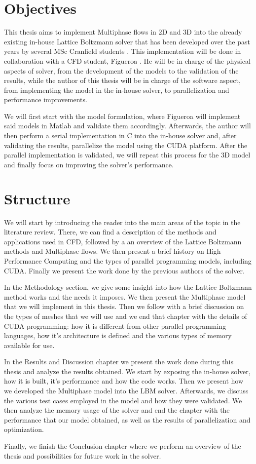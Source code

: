\documentclass[12pt]{book}
\begin{document}
\section{Objectives}
This thesis aims to implement Multiphase flows in 2D and 3D into the already existing in-house Lattice Boltzmann solver that has been developed over the past years by several MSc Cranfield students  \cite{maciej_thesis,koleszar_thesis,jozsa_thesis,szoke_thesis}. This implementation will be done in collaboration with a CFD student, Figueroa \cite{antonioThesis}. He will be in charge of the physical aspects of solver, from the development of the models to the validation of the results, while the author of this thesis will be in charge of the software aspect, from implementing the model in the in-house solver, to parallelization and performance improvements. \par
We will first start with the model formulation, where Figueroa will implement said models in Matlab and validate them accordingly. Afterwards, the author will then perform a serial implementation in C into the in-house solver and, after validating the results, parallelize the model using the CUDA platform. After the parallel implementation is validated, we will repeat this process for the 3D model and finally focus on improving the solver's performance. 
\section{Structure}
We will start by introducing the reader into the main areas of the topic in the literature review. There, we can find a description of the methods and applications used in CFD, followed by a an overview of the Lattice Boltzmann methods and Multiphase flows. We then present a brief history on High Performance Computing and the types of parallel programming models, including CUDA. Finally we present the work done by the previous authors of the solver.\par
In the Methodology section, we give some insight into how the Lattice Boltzmann method works and the needs it imposes. We then present the Multiphase model that we will implement in this thesis. Then we follow with a brief discussion on the types of meshes that we will use and we end that chapter with the details of CUDA programming: how it is different from other parallel programming languages, how it's architecture is defined and the various types of memory available for use.\par
In the Results and Discussion chapter we present the work done during this thesis and analyze the results obtained. We start by exposing the in-house solver, how it is built, it's performance and how the code works. Then we present how we developed the Multiphase model into the LBM solver. Afterwards, we discuss the various test cases employed in the model and how they were validated. We then analyze the memory usage of the solver and end the chapter with the performance that our model obtained, as well as the results of parallelization and optimization.\par
Finally, we finish the Conclusion chapter where we perform an overview of the thesis and possibilities for future work in the solver.
\end{document}
